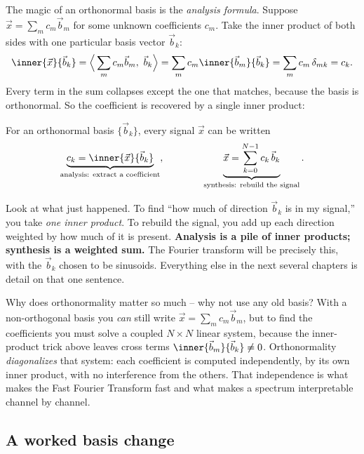 The magic of an orthonormal basis is the \emph{analysis formula}. Suppose
$\vec{x}=\sum_m c_m \vec{b}_m$ for some unknown coefficients $c_m$. Take the inner product of both
sides with one particular basis vector $\vec{b}_k$:
\[
  \inner{\vec{x}}{\vec{b}_k}
  = \Big\langle \sum_m c_m \vec{b}_m,\ \vec{b}_k \Big\rangle
  = \sum_m c_m \inner{\vec{b}_m}{\vec{b}_k}
  = \sum_m c_m\,\delta_{mk}
  = c_k .
\]
Every term in the sum collapses except the one that matches, because the basis is orthonormal. So
the coefficient is recovered by a single inner product:

\begin{theorem}
\label{ch03:thm-analysis}
For an orthonormal basis $\{\vec{b}_k\}$, every signal $\vec{x}$ can be written
\[
  \underbrace{c_k = \inner{\vec{x}}{\vec{b}_k}}_{\text{analysis: extract a coefficient}},
  \qquad\qquad
  \underbrace{\vec{x} = \sum_{k=0}^{N-1} c_k\,\vec{b}_k}_{\text{synthesis: rebuild the signal}} .
\]
\end{theorem}

\begin{happeningbox}
Look at what just happened. To find ``how much of direction $\vec{b}_k$ is in my signal,'' you take
\emph{one inner product}. To rebuild the signal, you add up each direction weighted by how much of it
is present. \textbf{Analysis is a pile of inner products; synthesis is a weighted sum.} The Fourier
transform will be precisely this, with the $\vec{b}_k$ chosen to be sinusoids. Everything else in
the next several chapters is detail on that one sentence.
\end{happeningbox}

\begin{whybox}
Why does orthonormality matter so much -- why not use any old basis? With a non-orthogonal basis you
\emph{can} still write $\vec{x}=\sum_m c_m \vec{b}_m$, but to find the coefficients you must solve a
coupled $N\times N$ linear system, because the inner-product trick above leaves cross terms
$\inner{\vec{b}_m}{\vec{b}_k}\neq 0$. Orthonormality \emph{diagonalizes} that system: each
coefficient is computed independently, by its own inner product, with no interference from the
others. That independence is what makes the Fast Fourier Transform fast and what makes a spectrum
interpretable channel by channel.
\end{whybox}

\subsection{A worked basis change}
\label{ch03:basis-change}

